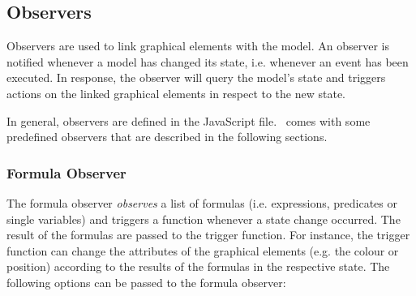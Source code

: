 %
%

\subsection{Observers}
\label{b_observers}

Observers are used to link graphical elements with the model. 
An observer is notified whenever a model has changed its state, i.e. whenever an event has been executed. 
In response, the observer will query the model's state and triggers actions on the linked graphical elements in respect to the new state. 

In general, observers are defined in the JavaScript file. 
\bms~comes with some predefined observers that are described in the following sections.

\subsubsection{Formula Observer}

The formula observer \textit{observes} a list of formulas (i.e. expressions, predicates or single variables) and triggers a function whenever a state change occurred.
The result of the formulas are passed to the trigger function.
For instance, the trigger function can change the attributes of the graphical elements (e.g. the colour or position) according to the results of the formulas in the respective state.
The following options can be passed to the formula observer:

